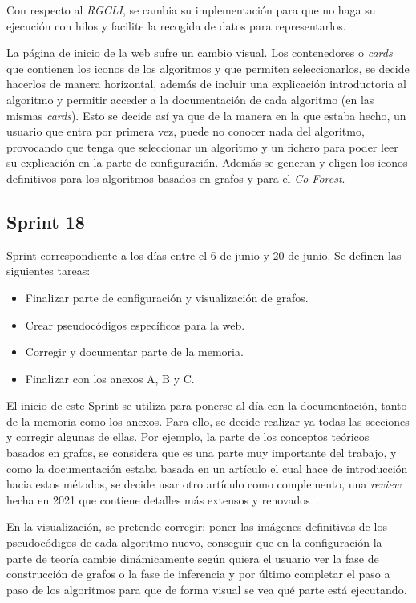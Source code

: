 Con respecto al \textit{RGCLI}, se cambia su implementación para que no haga su ejecución con hilos y facilite la recogida de datos para representarlos.

La página de inicio de la web sufre un cambio visual. Los contenedores o \textit{cards} que contienen los iconos de los algoritmos y que permiten seleccionarlos, se decide hacerlos de manera horizontal, además de incluir una explicación introductoria al algoritmo y permitir acceder a la documentación de cada algoritmo (en las mismas \textit{cards}). Esto se decide así ya que de la manera en la que estaba hecho, un usuario que entra por primera vez, puede no conocer nada del algoritmo, provocando que tenga que seleccionar un algoritmo y un fichero para poder leer su explicación en la parte de configuración. Además se generan y eligen los iconos definitivos para los algoritmos basados en grafos y para el \textit{Co-Forest}.


\subsection{Sprint 18}
Sprint correspondiente a los días entre el 6 de junio y 20 de junio. Se definen las siguientes tareas:
\begin{itemize}
	\item Finalizar parte de configuración y visualización de grafos.
	\item Crear pseudocódigos específicos para la web.
	\item Corregir y documentar parte de la memoria.
	\item Finalizar con los anexos A, B y C.
\end{itemize}

El inicio de este Sprint se utiliza para ponerse al día con la documentación, tanto de la memoria como los anexos. Para ello, se decide realizar ya todas las secciones y corregir algunas de ellas. Por ejemplo, la parte de los conceptos teóricos basados en grafos, se considera que es una parte muy importante del trabajo, y como la documentación estaba basada en un artículo el cual hace de introducción hacia estos métodos, se decide usar otro artículo como complemento, una \textit{review} hecha en 2021 que contiene detalles más extensos y renovados~\cite{GSSL:review}.

En la visualización, se pretende corregir: poner las imágenes definitivas de los pseudocódigos de cada algoritmo nuevo, conseguir que en la configuración la parte de teoría cambie dinámicamente según quiera el usuario ver la fase de construcción de grafos o la fase de inferencia y por último completar el paso a paso de los algoritmos para que de forma visual se vea qué parte está ejecutando.

